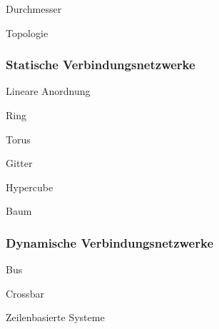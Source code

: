 \begin{defi}[Verbindungsnetzwerk]{Durchmesser}

\end{defi}

\begin{defi}[Verbindungsnetzwerk]{Topologie}

\end{defi}

\subsubsection{Statische Verbindungsnetzwerke}

\begin{defi}{Lineare Anordnung}

\end{defi}

\begin{defi}{Ring}

\end{defi}

\begin{defi}{Torus}

\end{defi}

\begin{defi}{Gitter}

\end{defi}

\begin{defi}{Hypercube}

\end{defi}

\begin{defi}{Baum}

\end{defi}

\subsubsection{Dynamische Verbindungsnetzwerke}

\begin{defi}{Bus}

\end{defi}

\begin{defi}{Crossbar}

\end{defi}

\begin{defi}{Zeilenbasierte Systeme}

\end{defi}

